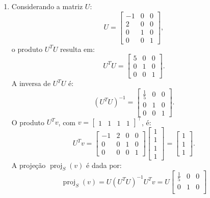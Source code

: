 \begin{resolution}
\begin{enumerate}[label=\alph*)]
    \item Considerando a matriz \( U \):
          \[
            U = \begin{bmatrix}
              -1 & 0 & 0 \\
              2  & 0 & 0 \\
              0  & 1 & 0 \\
              0  & 0 & 1
            \end{bmatrix},
          \]
          o produto \( U^T U \) resulta em:
          \[
            U^T U = \begin{bmatrix}
              5 & 0 & 0 \\
              0 & 1 & 0 \\
              0 & 0 & 1
            \end{bmatrix}.
          \]
          A inversa de \( U^T U \) é:
          \[
            (U^T U)^{-1} = \begin{bmatrix}
              \frac{1}{5} & 0 & 0 \\
              0           & 1 & 0 \\
              0           & 0 & 1
            \end{bmatrix}.
          \]
          O produto \( U^T v \), com \( v = \begin{bmatrix} 1 & 1 & 1 & 1 \end{bmatrix}^{\top} \), é:
          \[
            U^T v = \begin{bmatrix}
              -1 & 2 & 0 & 0 \\
              0  & 0 & 1 & 0 \\
              0  & 0 & 0 & 1
            \end{bmatrix}
            \begin{bmatrix}
              1 \\ 1 \\ 1 \\ 1
            \end{bmatrix}
            = \begin{bmatrix}
              1 \\ 1 \\ 1
            \end{bmatrix}.
          \]
          A projeção \( \operatorname{proj}_S(v) \) é dada por:
          \[
            \operatorname{proj}_S(v) = U (U^T U)^{-1} U^T v = U \begin{bmatrix}
              \frac{1}{5} & 0 & 0 \\
              0           & 1 & 0 \\

\end{bmatrix}\]
\end{enumerate}
\end{resolution}
